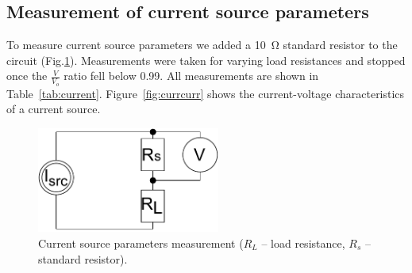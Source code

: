 \subsection{Measurement of current source parameters}

To measure current source parameters we added a \SI{10}{\ohm} standard resistor to the circuit (Fig.\ref{fig:current}). Measurements were taken for varying load resistances and stopped once the $\frac{V}{V_o}$ ratio fell below 0.99. All measurements are shown in Table~\ref{tab:current}. Figure~\ref{fig:currcurr} shows the current-voltage characteristics of a current source. 

\begin{figure}[H]
	\centering
	\includegraphics[width=6cm]{schematics/3.pdf}
	\caption{Current source parameters measurement ($R_L$ -- load resistance, $R_s$ -- standard resistor).}
	\label{fig:current}
\end{figure}

